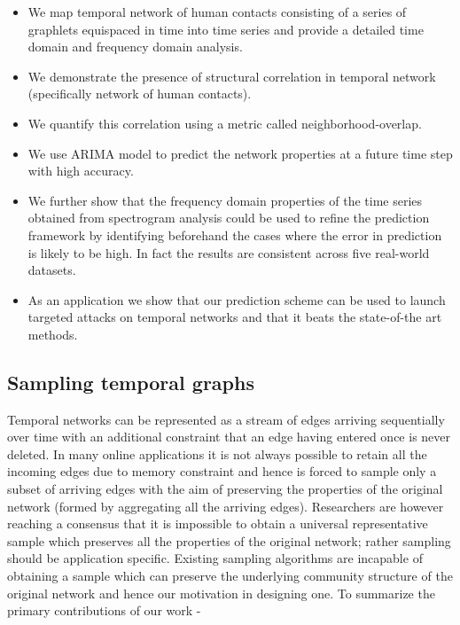 \begin{itemize}
 \item We map temporal network of human contacts consisting of a series of graphlets equispaced in time into time series and provide a detailed
time domain and frequency domain analysis.

\item We demonstrate the presence of structural correlation in temporal network (specifically network of human contacts).

\item We quantify this correlation using a metric called neighborhood-overlap.

\item We use ARIMA model to predict the network properties at a future time step with high accuracy. 

\item We further show that the frequency domain properties
of the time series obtained from spectrogram analysis could be used to refine the prediction framework by identifying beforehand the cases where the error in prediction is likely to be high. In fact the results are consistent across five real-world datasets.

\item As an application we show that our prediction scheme can be used to launch targeted attacks on temporal networks and that it beats the state-of-the art methods.

\end{itemize}

\subsection{Sampling temporal graphs} 
Temporal networks can be represented as a stream of edges arriving sequentially over time with an additional constraint that an edge having entered once is never deleted. In many online applications it is not always possible to retain all the incoming edges due to memory constraint and hence is forced to sample only a subset of arriving edges with the aim of preserving the properties of the original network (formed by aggregating all the arriving edges). Researchers are however reaching a consensus that it is impossible to obtain a universal representative sample which preserves all the properties of the original network; rather sampling should be application specific. Existing sampling algorithms are incapable of obtaining a sample which can preserve the underlying community structure of the original network and hence our motivation in designing one. To summarize the primary contributions of our work - 

